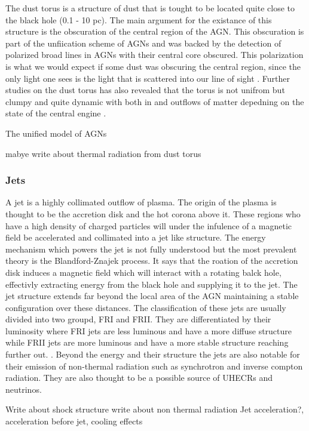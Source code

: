 \documentclass{article}
\begin{document}
The dust torus is a structure of dust that is tought to be located quite close to the black hole (0.1 - 10 pc). The main argument for the existance of this structure is the obscuration of the central region of the AGN. This obscuration 
is part of the unfiication scheme of AGNs and was backed by the detection of polarized broad lines in AGNs with their central core obscured. This polarization is what we would expect if some dust was obscuring the central region, since the only light one sees is 
the light that is scattered into our line of sight \cite{MASON201597}. Further studies on the dust torus has also revealed that the torus is not unifrom but clumpy and quite dynamic with both in and outflows of matter depedning on the state of the central engine \cite{MASON201597}. 




The unified model of AGNs 


mabye write about thermal radiation from dust torus


\subsubsection{Jets}

A jet is a highly collimated outflow of plasma. The origin of the plasma is thought to be the accretion disk and the hot corona above it. These regions who have a high density of charged particles will  under the infulence of a magnetic field be accelerated and collimated into a jet like structure.
The energy mechanism which powers the jet is not fully understood but the most prevalent theory is the Blandford-Znajek process. It says that the roation of the accretion disk  induces a magnetic field which will interact with a rotating balck hole, effectivly extracting energy from the black hole and supplying it to the jet. 
The jet structure extends far beyond the local area of the AGN maintaining a stable configuration over these distances. The classification of these jets are usually divided into two groupd, FRI and FRII. They are differentiated by their luminosity where FRI jets are less luminous and have a more diffuse structure while FRII jets are more luminous and have a more stable structure reaching further out. \cite{walg2013relativistic}.
Beyond the energy and their structure the jets are also notable for their emission of non-thermal radiation such as synchrotron and inverse compton radiation. They are also thought to be a possible source of UHECRs and neutrinos.


Write about shock structure
write about non thermal radiation
Jet acceleration?, acceleration before jet, cooling effects
\end{document}
